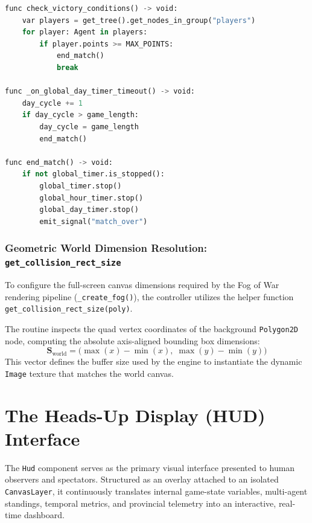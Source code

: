 \begin{lstlisting}[language=python, caption={Victory condition evaluation and match termination routines in GameController.gd.}, label={lst:victory_conditions}]
func check_victory_conditions() -> void:
    var players = get_tree().get_nodes_in_group("players")
    for player: Agent in players:
        if player.points >= MAX_POINTS:
            end_match()
            break

func _on_global_day_timer_timeout() -> void:
    day_cycle += 1
    if day_cycle > game_length:
        day_cycle = game_length
        end_match()

func end_match() -> void:
    if not global_timer.is_stopped():
        global_timer.stop()
        global_hour_timer.stop()
        global_day_timer.stop()
        emit_signal("match_over")
\end{lstlisting}

\subsubsection{Geometric World Dimension Resolution: \texttt{get\_collision\_rect\_size}}
To configure the full-screen canvas dimensions required by the Fog of War rendering pipeline (\texttt{\_create\_fog()}), the controller utilizes the helper function \texttt{get\_collision\_rect\_size(poly)}.

The routine inspects the quad vertex coordinates of the background \texttt{Polygon2D} node, computing the absolute axis-aligned bounding box dimensions:
\begin{equation}
    \mathbf{S}_{\text{world}} = \big(\max(x) - \min(x), \; \max(y) - \min(y)\big)
\end{equation}
This vector defines the buffer size used by the engine to instantiate the dynamic \texttt{Image} texture that matches the world canvas.

\section{The Heads-Up Display (HUD) Interface}
\label{sec:hud_interface}

The \texttt{Hud} component serves as the primary visual interface presented to human observers and spectators. Structured as an overlay attached to an isolated \texttt{CanvasLayer}, it continuously translates internal game-state variables, multi-agent standings, temporal metrics, and provincial telemetry into an interactive, real-time dashboard.

